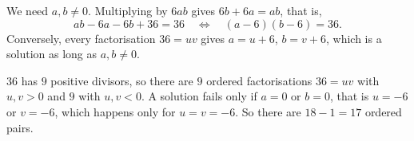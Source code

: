 We need $a,b\ne0$. Multiplying by $6ab$ gives $6b+6a=ab$, that is,
\[ab-6a-6b+36=36\quad\Longleftrightarrow\quad(a-6)(b-6)=36.\]
Conversely, every factorisation $36=uv$ gives $a=u+6$, $b=v+6$, which is a solution as long as $a,b\ne0$.

$36$ has $9$ positive divisors, so there are $9$ ordered factorisations $36=uv$ with $u,v>0$ and $9$ with $u,v<0$. A solution fails only if $a=0$ or $b=0$, that is $u=-6$ or $v=-6$, which happens only for $u=v=-6$. So there are $18-1=\boxed{17}$ ordered pairs.
